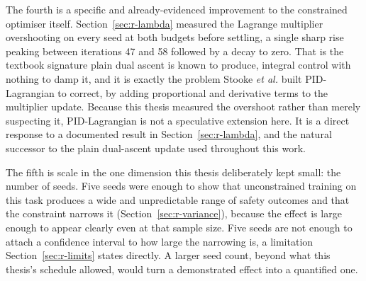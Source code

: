 The fourth is a specific and already-evidenced improvement to the constrained optimiser itself.
Section~\ref{sec:r-lambda} measured the Lagrange multiplier overshooting on every seed at both
budgets before settling, a single sharp rise peaking between iterations 47 and 58 followed by a
decay to zero. That is the textbook signature plain dual ascent is known to produce, integral
control with nothing to damp it, and it is exactly the problem Stooke \emph{et al.}
\cite{stooke2020pid} built PID-Lagrangian to correct, by adding proportional and derivative terms
to the multiplier update. Because this thesis measured the overshoot rather than merely suspecting
it, PID-Lagrangian is not a speculative extension here. It is a direct response to a documented
result in Section~\ref{sec:r-lambda}, and the natural successor to the plain dual-ascent update
used throughout this work.

The fifth is scale in the one dimension this thesis deliberately kept small: the number of seeds.
Five seeds were enough to show that unconstrained training on this task produces a wide and
unpredictable range of safety outcomes and that the constraint narrows it
(Section~\ref{sec:r-variance}), because the effect is large enough to appear clearly even at that
sample size. Five seeds are not enough to attach a confidence interval to how large the narrowing
is, a limitation Section~\ref{sec:r-limits} states directly. A larger seed count, beyond what this
thesis's schedule allowed, would turn a demonstrated effect into a quantified one.
